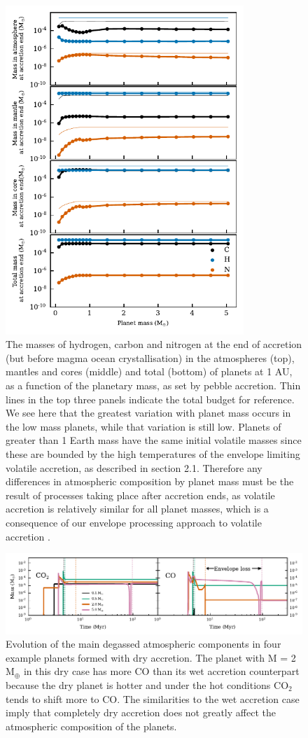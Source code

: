 \documentclass[bibyear,tradiabstract]{aa}
\begin{document}
\begin{figure}
\centering
\includegraphics[width=9cm]{hcnplot_medium.pdf}
   \caption{The masses of hydrogen, carbon and nitrogen at the end of accretion (but before magma ocean crystallisation) in the atmospheres (top), mantles and cores (middle) and total (bottom) of planets at 1 AU, as a function of the planetary mass, as set by pebble accretion. {Thin lines in the top three panels indicate the total budget for reference.} We see here that the greatest variation with planet mass occurs in the low mass planets, while that variation is still low. {Planets of greater than 1 Earth mass have the same initial volatile masses since these are bounded by the high temperatures of the envelope limiting volatile accretion, as described in section 2.1.} Therefore any differences in atmospheric composition by planet mass must be the result of processes taking place after accretion ends, as volatile accretion is relatively similar for all planet masses, which is a consequence of our envelope processing approach to volatile accretion \citep{Johansen+2023III}.
           }
      \label{Fig:HCN}
\end{figure}
\begin{figure}
\centering
\includegraphics[width=18cm]{atmcomparisons_dryshort.pdf}
   \caption{Evolution of the main degassed atmospheric components in four example planets formed with dry accretion. The planet with M = 2 M$_{\oplus}$ in this {dry} case has {more} CO than its wet accretion counterpart because the dry planet is {hotter and under the hot conditions CO$_2$ tends to shift more to CO}. The similarities to the wet accretion case imply that completely dry accretion does not greatly affect the atmospheric composition of the planets.}
      \label{Fig:atmcomp_dry}
\end{figure}
\end{document}
